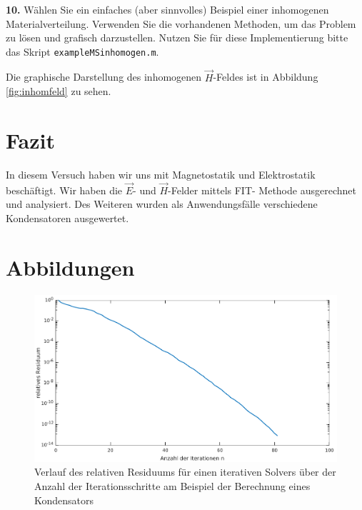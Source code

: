 \documentclass[Protokollheft.tex]{subfiles}
\begin{document}
\begin{framed}
	\noindent \textbf{10.} Wählen Sie ein einfaches (aber sinnvolles) Beispiel einer inhomogenen Materialverteilung. Verwenden Sie die vorhandenen Methoden, um das
Problem zu lösen und grafisch darzustellen. Nutzen Sie für diese Implementierung bitte das Skript \lstinline{exampleMSinhomogen.m}.\label{exer:Hfield4inhomogenMaterial}
\end{framed}
\noindent
Die graphische Darstellung des inhomogenen $\vec{H}$-Feldes ist in Abbildung \ref{fig:inhomfeld} zu sehen.



\section{Fazit}
In diesem Versuch haben wir uns mit Magnetostatik und Elektrostatik beschäftigt. Wir haben die $\vec{E}$- und $\vec{H}$-Felder mittels FIT- Methode ausgerechnet und analysiert. Des Weiteren wurden als Anwendungsfälle verschiedene Kondensatoren ausgewertet.

\clearpage
\newpage
\section{Abbildungen}
\begin{figure}[h!]
	\centering
	\includegraphics[width=0.7\linewidth]{ResidiumIterationenGraph.pdf}
	\caption{Verlauf des relativen Residuums für einen iterativen Solvers über der Anzahl der Iterationsschritte am Beispiel der Berechnung eines Kondensators}
	\label{fig:residiumiIterationen}
\end{figure}
\end{document}

